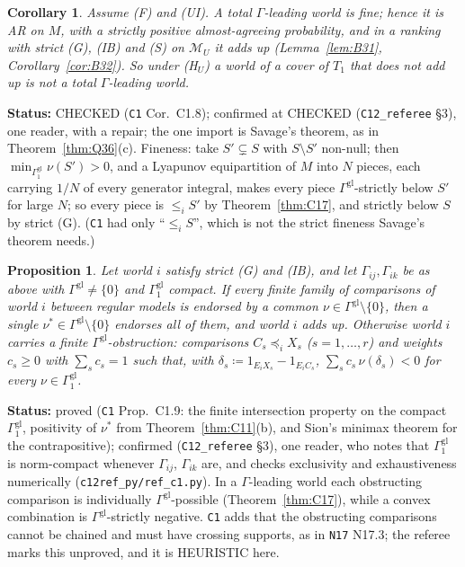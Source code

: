 \documentclass[11pt]{article}
\newtheorem{proposition}[theorem]{Proposition}
\newtheorem{corollary}[theorem]{Corollary}
\theoremstyle{definition}
\theoremstyle{remark}
\newcommand{\M}{\mathcal M}
\newcommand{\src}[1]{\texttt{#1}}
\newcommand{\status}[1]{\par\smallskip\noindent\textbf{Status:} #1\par\smallskip}
\begin{document}
\begin{corollary}\label{cor:C18}
Assume (F) and (UI). A total $\Gamma$-leading world is fine; hence it is AR on $M$, with a strictly positive almost-agreeing probability, and in a ranking with strict (G), (IB) and (S) on $\M_U$ it adds up (Lemma~\ref{lem:B31}, Corollary~\ref{cor:B32}). So under (H$_U$) a world of a cover of $T_1$ that does not add up is not a total $\Gamma$-leading world.
\end{corollary}
\status{CHECKED (\src{C1} Cor.~C1.8); confirmed at CHECKED (\src{C12\_referee} \S3), one reader, with a repair; the one import is Savage's theorem, as in Theorem~\ref{thm:Q36}(c). Fineness: take $S'\subsetneq S$ with $S\setminus S'$ non-null; then $\min_{\Gamma^{\mathrm{gl}}_1}\nu(S')>0$, and a Lyapunov equipartition of $M$ into $N$ pieces, each carrying $1/N$ of every generator integral, makes every piece $\Gamma^{\mathrm{gl}}$-strictly below $S'$ for large $N$; so every piece is $\le_iS'$ by Theorem~\ref{thm:C17}, and strictly below $S$ by strict (G). (\src{C1} had only ``$\le_iS$'', which is not the strict fineness Savage's theorem needs.)}

\begin{proposition}\label{prop:C19}
Let world $i$ satisfy strict (G) and (IB), and let $\Gamma_{ij},\Gamma_{ik}$ be as above with $\Gamma^{\mathrm{gl}}\ne\{0\}$ and $\Gamma^{\mathrm{gl}}_1$ compact. If every finite family of comparisons of world $i$ between regular models is endorsed by a common $\nu\in\Gamma^{\mathrm{gl}}\setminus\{0\}$, then a single $\nu^*\in\Gamma^{\mathrm{gl}}\setminus\{0\}$ endorses all of them, and world $i$ adds up. Otherwise world $i$ carries a \emph{finite $\Gamma^{\mathrm{gl}}$-obstruction}: comparisons $C_s\preceq_iX_s$ ($s=1,\dots,r$) and weights $c_s\ge0$ with $\sum_sc_s=1$ such that, with $\delta_s\coloneqq1_{E_iX_s}-1_{E_iC_s}$, $\sum_sc_s\,\nu(\delta_s)<0$ for every $\nu\in\Gamma^{\mathrm{gl}}_1$.
\end{proposition}
\status{proved (\src{C1} Prop.~C1.9: the finite intersection property on the compact $\Gamma^{\mathrm{gl}}_1$, positivity of $\nu^*$ from Theorem~\ref{thm:C11}(b), and Sion's minimax theorem for the contrapositive); confirmed (\src{C12\_referee} \S3), one reader, who notes that $\Gamma^{\mathrm{gl}}_1$ is norm-compact whenever $\Gamma_{ij}$, $\Gamma_{ik}$ are, and checks exclusivity and exhaustiveness numerically (\src{c12ref\_py/ref\_c1.py}). In a $\Gamma$-leading world each obstructing comparison is individually $\Gamma^{\mathrm{gl}}$-possible (Theorem~\ref{thm:C17}), while a convex combination is $\Gamma^{\mathrm{gl}}$-strictly negative. \src{C1} adds that the obstructing comparisons cannot be chained and must have crossing supports, as in \src{N17} N17.3; the referee marks this unproved, and it is HEURISTIC here.}
\end{document}
